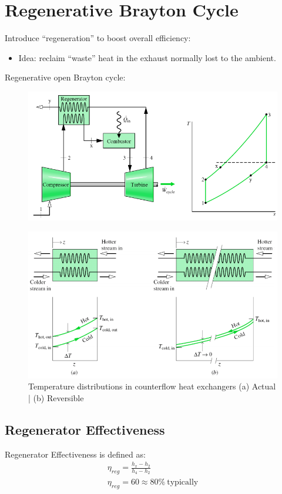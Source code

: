 \documentclass[class=report, crop=false, 12pt,a4paper]{standalone}
\numberwithin{equation}{section}
\begin{document}
\section{Regenerative Brayton Cycle}
Introduce “regeneration” to boost overall efficiency: 
\begin{itemize}[noitemsep]
  \item Idea: reclaim “waste” heat in the exhaust normally lost to the ambient.
\end{itemize}
Regenerative open Brayton cycle:
\begin{figure}[H]
  \centering
  \includegraphics[width = 0.95 \textwidth]{../img/diagram165.png}
  \caption{}
\end{figure}
\begin{figure}[H]
  \centering
  \includegraphics[width = 0.95 \textwidth]{../img/diagram166.png}
  \caption{Temperature distributions in counterflow heat exchangers (a) Actual | (b) Reversible}
\end{figure}
\subsection{Regenerator Effectiveness}
Regenerator Effectiveness is defined as:
\begin{gather}
  \eta_{reg} = \frac{h_x-h_2}{h_4-h_2} \\[5pt]
  \eta_{reg} = 60 \approx 80\% \ \text{typically}
\end{gather}
\end{document}
